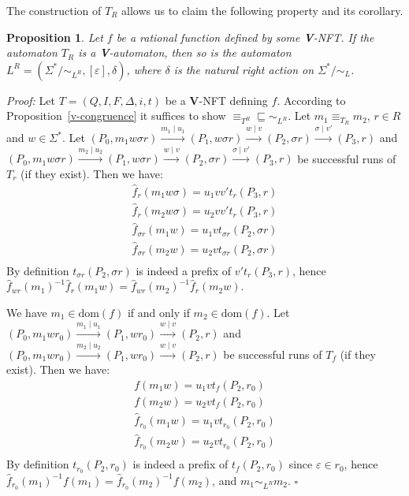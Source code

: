\documentclass[12pt]{report}
\newtheorem{prp}{Proposition}[section]
\theoremstyle{definition}
\theoremstyle{remark}
\newenvironment{prf}
{\textit{Proof:}}
{\hfill $\square$\\}
\begin{document}
The construction of $T_R$ allows us to claim the following property and its corollary.
\begin{prp}
\label{prp1}
Let $f$ be a rational function defined by some \textbf V-NFT.
If the automaton $T_R$ is a \textbf V-automaton, then so is the automaton $L^R=(\Sigma^\ast / \sim_{L^R},[\varepsilon],\delta)$, where $\delta$ is the natural right action on $\Sigma^\ast / \sim_L$.
\end{prp}
\begin{prf}
Let $T=(Q,I,F,\Delta,i,t)$ be a \textbf V-NFT defining $f$.
According to Proposition~\ref{v-congruence} it suffices to show ${\equiv_{T^R}}\sqsubseteq{\sim_{L^R}}$.
Let $m_1\equiv_{T_R}m_2$, $r\in R$ and $w \in \Sigma^\ast$.
Let $(P_0,m_1w\sigma r)\xrightarrow{m_1\mid u_1}(P_1,w\sigma r)\xrightarrow {w\mid v} (P_2,\sigma r)\xrightarrow {\sigma \mid v'} (P_3, r)$ and 
$(P_0,m_1w\sigma r)\xrightarrow{m_2\mid u_2}(P_1,w\sigma r)\xrightarrow {w\mid v} (P_2,\sigma r)\xrightarrow {\sigma \mid v'} (P_3, r)$ be successful runs of $T_r$ (if they exist). Then we have:
$$\begin{array}{l}
\widehat f_r(m_1w\sigma)=u_1vv't_r(P_3,r) \\
\widehat f_r(m_2w\sigma)=u_2vv't_r(P_3,r)\\
\widehat f_{\sigma r}(m_1w)=u_1vt_{\sigma r}(P_2,\sigma r)\\
\widehat f_{\sigma r}(m_2w)=u_2vt_{\sigma r}(P_2,\sigma r)\\
\end{array}$$
By definition $t_{\sigma r}(P_2,\sigma r)$ is indeed a prefix of $v't_r(P_3,r)$, hence $\widehat f_{w r}(m_1)^{-1}\widehat f_r(m_1w)=\widehat f_{w r}(m_2)^{-1}\widehat f_r(m_2w)$.

We have $m_1\in \mathrm{dom}(f)$ if and only if $m_2\in \mathrm{dom}(f)$.
Let $(P_0,m_1wr_0)\xrightarrow{m_1\mid u_1}(P_1,wr_0)\xrightarrow {w\mid v} (P_2,r)$ and 
$(P_0,m_1wr_0)\xrightarrow{m_2\mid u_2}(P_1,wr_0)\xrightarrow {w\mid v} (P_2,r)$ be successful runs of $T_f$ (if they exist).
Then we have:
$$\begin{array}{l}
f(m_1w)=u_1vt_f(P_2,r_0) \\
f(m_2w)=u_2vt_f(P_2,r_0)\\
\widehat f_{r_0}(m_1w)=u_1vt_{r_0}(P_2,r_0)\\
\widehat f_{r_0}(m_2w)=u_2vt_{r_0}(P_2,r_0)\\
\end{array}$$
By definition $t_{r_0}(P_2,r_0)$ is indeed a prefix of $t_f(P_2,r_0)$ since $\varepsilon \in r_0$, hence $\widehat f_{r_0}(m_1)^{-1}f(m_1)=\widehat f_{r_0}(m_2)^{-1}f(m_2)$, and $m_1\sim_{L^R}m_2$.
\end{prf}
\end{document}
